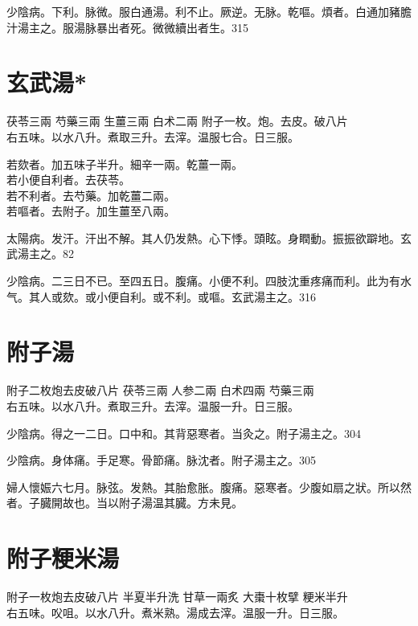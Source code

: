 少陰病。下利。脉微。服白通湯。利不止。厥逆。无脉。乾嘔。煩者。白通加豬膽汁湯主之。服湯脉暴出者死。微{\khaaitp 微}續{\khaaitp 出}者生。315

\section{玄武湯*}

茯苓{\scriptsize 三兩} 芍藥{\scriptsize 三兩} 生薑{\scriptsize 三兩} 白术{\scriptsize 二兩} 附子{\scriptsize 一枚。炮。去皮。破八片}\\
右五味。以水八升。煮取三升。去滓。温服七合。日三服。

若欬者。加五味子半升。細辛一兩。乾薑一兩。\\
若小便自利者。去茯苓。\\
若不利者。去芍藥。加乾薑二兩。\\
若嘔者。去附子。加生薑至八兩。

太陽病。发汗。汗出不解。其人仍发熱。心下悸。頭眩。身瞤動。振振欲躃地。玄武湯主之。82

少陰病。二三日不已。至四五日。腹痛。小便不利。四肢沈重疼痛而利。此为有水气。其人或欬。或小便{\khaaitp 自}利。或不利。或嘔。玄武湯主之。316

\section{附子湯}

附子{\scriptsize 二枚炮去皮破八片} 茯苓{\scriptsize 三兩} 人参{\scriptsize 二兩} 白术{\scriptsize 四兩} 芍藥{\scriptsize 三兩}\\
右五味。以水八升。煮取三升。去滓。温服一升。日三服。

少陰病。得之一二日。口中和。其背惡寒者。当灸之。附子湯主之。304

少陰病。身体痛。手足寒。骨節痛。脉沈者。附子湯主之。305

婦人懷娠六七月。脉弦。发熱。其胎愈胀。腹痛。惡寒者。少腹如扇之狀。所以然者。子臓開故也。当以附子湯温其臓。{\scriptsize 方未見。}

\section{附子粳米湯}

附子{\scriptsize 一枚炮去皮破八片} 半夏{\scriptsize 半升洗} 甘草{\scriptsize 一兩炙} 大棗{\scriptsize 十枚擘} 粳米{\scriptsize 半升}\\
右五味。㕮咀。以水八升。煮米熟。湯成去滓。温服一升。日三服。

